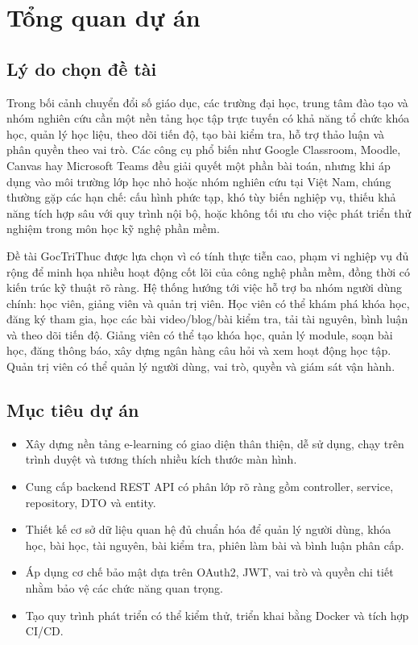 \documentclass[12pt,a4paper]{report}
\newcommand{\projectname}{GocTriThuc}
\begin{document}
\chapter{Tổng quan dự án}

\section{Lý do chọn đề tài}
Trong bối cảnh chuyển đổi số giáo dục, các trường đại học, trung tâm đào tạo và nhóm nghiên cứu cần một nền tảng học tập trực tuyến có khả năng tổ chức khóa học, quản lý học liệu, theo dõi tiến độ, tạo bài kiểm tra, hỗ trợ thảo luận và phân quyền theo vai trò. Các công cụ phổ biến như Google Classroom, Moodle, Canvas hay Microsoft Teams đều giải quyết một phần bài toán, nhưng khi áp dụng vào môi trường lớp học nhỏ hoặc nhóm nghiên cứu tại Việt Nam, chúng thường gặp các hạn chế: cấu hình phức tạp, khó tùy biến nghiệp vụ, thiếu khả năng tích hợp sâu với quy trình nội bộ, hoặc không tối ưu cho việc phát triển thử nghiệm trong môn học kỹ nghệ phần mềm.

Đề tài \projectname{} được lựa chọn vì có tính thực tiễn cao, phạm vi nghiệp vụ đủ rộng để minh họa nhiều hoạt động cốt lõi của công nghệ phần mềm, đồng thời có kiến trúc kỹ thuật rõ ràng. Hệ thống hướng tới việc hỗ trợ ba nhóm người dùng chính: học viên, giảng viên và quản trị viên. Học viên có thể khám phá khóa học, đăng ký tham gia, học các bài video/blog/bài kiểm tra, tải tài nguyên, bình luận và theo dõi tiến độ. Giảng viên có thể tạo khóa học, quản lý module, soạn bài học, đăng thông báo, xây dựng ngân hàng câu hỏi và xem hoạt động học tập. Quản trị viên có thể quản lý người dùng, vai trò, quyền và giám sát vận hành.

\section{Mục tiêu dự án}
\begin{itemize}
  \item Xây dựng nền tảng e-learning có giao diện thân thiện, dễ sử dụng, chạy trên trình duyệt và tương thích nhiều kích thước màn hình.
  \item Cung cấp backend REST API có phân lớp rõ ràng gồm controller, service, repository, DTO và entity.
  \item Thiết kế cơ sở dữ liệu quan hệ đủ chuẩn hóa để quản lý người dùng, khóa học, bài học, tài nguyên, bài kiểm tra, phiên làm bài và bình luận phân cấp.
  \item Áp dụng cơ chế bảo mật dựa trên OAuth2, JWT, vai trò và quyền chi tiết nhằm bảo vệ các chức năng quan trọng.
  \item Tạo quy trình phát triển có thể kiểm thử, triển khai bằng Docker và tích hợp CI/CD.
\end{itemize}
\end{document}
